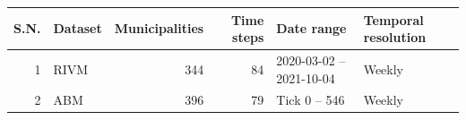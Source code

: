 \begin{tabular}{rlrrll}
\toprule
S.N. & Dataset & Municipalities & Time steps & Date range & Temporal resolution \\
\midrule
1 & RIVM & 344 & 84 & 2020-03-02 – 2021-10-04 & Weekly \\
2 & ABM & 396 & 79 & Tick 0 – 546 & Weekly \\
\bottomrule
\end{tabular}

